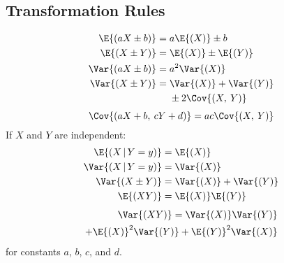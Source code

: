\documentclass{article}
\begin{document}
\begin{multicols}{3}
    \subsection{Transformation Rules}
    \begin{align*}
        \E{\left( aX \pm b \right)}   & = a\E{\left( X \right)} \pm b                        \\
        \E{\left( X \pm Y \right)}    & = \E{\left( X \right)} \pm \E{\left( Y \right)}      \\
        \Var{\left( aX \pm b \right)} & = a^2\Var{\left( X \right)}                          \\
        \Var{\left( X \pm Y \right)}  & = \begin{aligned}[t]
                                               & \Var{\left( X \right)} + \Var{\left( Y \right)} \\
                                               & \pm 2\Cov{\left( X,\: Y \right)}
                                          \end{aligned}
    \end{align*}
    \begin{equation*}
        \Cov{\left( aX + b,\: cY + d \right)} = ac \Cov{\left( X,\: Y \right)}
    \end{equation*}
    If \(X\) and \(Y\) are independent:
    \begingroup
    \allowdisplaybreaks
    \begin{align*}
        \E{\left( X \,\vert\, Y = y \right)}   & = \E{\left( X \right)}                            \\
        \Var{\left( X \,\vert\, Y = y \right)} & = \Var{\left( X \right)}                          \\
        \Var{\left( X \pm Y \right)}           & = \Var{\left( X \right)} + \Var{\left( Y \right)} \\
        \E{\left( XY \right)}                  & = \E{\left( X \right)} \E{\left( Y \right)}
    \end{align*}
    \endgroup
    \begin{align*}
        \Var{\left( XY \right)}      = \Var{\left( X \right)} \Var{\left( Y \right)} \\
        + \E{\left( X \right)}^2 \Var{\left( Y \right)} + \E{\left( Y \right)}^2 \Var{\left( X \right)}
    \end{align*}
    for constants \(a\), \(b\), \(c\), and \(d\).

\end{multicols}
\end{document}
